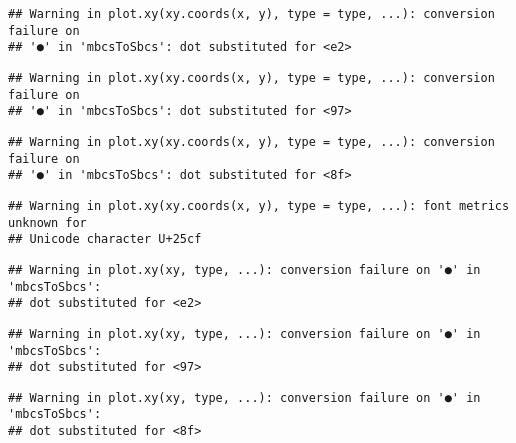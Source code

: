 \documentclass[
]{article}
\newenvironment{Shaded}{\begin{snugshade}}{\end{snugshade}}
\newcommand{\AttributeTok}[1]{\textcolor[rgb]{0.77,0.63,0.00}{#1}}
\newcommand{\DecValTok}[1]{\textcolor[rgb]{0.00,0.00,0.81}{#1}}
\newcommand{\FloatTok}[1]{\textcolor[rgb]{0.00,0.00,0.81}{#1}}
\newcommand{\FunctionTok}[1]{\textcolor[rgb]{0.00,0.00,0.00}{#1}}
\newcommand{\NormalTok}[1]{#1}
\newcommand{\SpecialCharTok}[1]{\textcolor[rgb]{0.00,0.00,0.00}{#1}}
\newcommand{\StringTok}[1]{\textcolor[rgb]{0.31,0.60,0.02}{#1}}
\begin{document}
\begin{verbatim}
## Warning in plot.xy(xy.coords(x, y), type = type, ...): conversion failure on
## '●' in 'mbcsToSbcs': dot substituted for <e2>
\end{verbatim}

\begin{verbatim}
## Warning in plot.xy(xy.coords(x, y), type = type, ...): conversion failure on
## '●' in 'mbcsToSbcs': dot substituted for <97>
\end{verbatim}

\begin{verbatim}
## Warning in plot.xy(xy.coords(x, y), type = type, ...): conversion failure on
## '●' in 'mbcsToSbcs': dot substituted for <8f>
\end{verbatim}

\begin{verbatim}
## Warning in plot.xy(xy.coords(x, y), type = type, ...): font metrics unknown for
## Unicode character U+25cf
\end{verbatim}

\begin{Shaded}
\end{Shaded}

\begin{verbatim}
## Warning in plot.xy(xy, type, ...): conversion failure on '●' in 'mbcsToSbcs':
## dot substituted for <e2>
\end{verbatim}

\begin{verbatim}
## Warning in plot.xy(xy, type, ...): conversion failure on '●' in 'mbcsToSbcs':
## dot substituted for <97>
\end{verbatim}

\begin{verbatim}
## Warning in plot.xy(xy, type, ...): conversion failure on '●' in 'mbcsToSbcs':
## dot substituted for <8f>
\end{verbatim}
\end{document}
